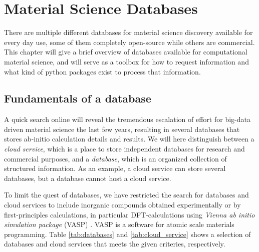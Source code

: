 \chapter{Material Science Databases}

There are multiple different databases for material science discovery available for every day use, some of them completely open-source while others are commercial. This chapter will give a brief overview of databases available for computational material science, and will serve as a toolbox for how to request information and what kind of python packages exist to process that information.





\section{Fundamentals of a database}

A quick search online will reveal the tremendous escalation of effort for big-data driven material science the last few years, resulting in several databases that stores ab-initio calculation details and results. We will here distinguish between a \textit{cloud service}, which is a place to store independent databases for research and commercial purposes, and a \textit{database}, which is an organized collection of structured information. As an example, a cloud service can store several databases, but a database cannot host a cloud service.

To limit the quest of databases, we have restricted the search for databases and cloud services to include inorganic compounds obtained experimentally or by first-principles calculations, in particular DFT-calculations using \textit{Vienna ab initio simulation package} (VASP) \cite{Kresse1996}. VASP is a software for atomic scale materials programming. Table \ref{tab:databases} and \ref{tab:cloud_service} shows a selection of databases and cloud services that meets the given criteries, respectively.

